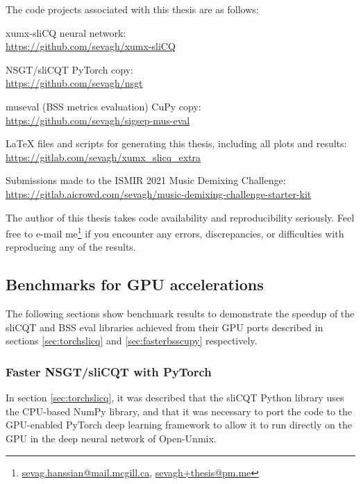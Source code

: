\documentclass[report.tex]{subfiles}
\begin{document}
The code projects associated with this thesis are as follows:
\begin{tight_enumerate}
	\item
		xumx-sliCQ neural network:\\
		\url{https://github.com/sevagh/xumx-sliCQ}
	\item
		NSGT/sliCQT PyTorch copy:\\
		\url{https://github.com/sevagh/nsgt}
	\item
		museval (BSS metrics evaluation) CuPy copy:\\
		\url{https://github.com/sevagh/sigsep-mus-eval}
	\item
		LaTeX files and scripts for generating this thesis, including all plots and results:\\
		\url{https://gitlab.com/sevagh/xumx_slicq_extra}
	\item
		Submissions made to the ISMIR 2021 Music Demixing Challenge:\\
		\url{https://gitlab.aicrowd.com/sevagh/music-demixing-challenge-starter-kit}
\end{tight_enumerate}

The author of this thesis takes code availability and reproducibility seriously. Feel free to e-mail me\footnote{\href{mailto:sevag.hanssian@mail.mcgill.ca}{sevag.hanssian@mail.mcgill.ca}, \href{mailto:sevagh+thesis@pm.me}{sevagh+thesis@pm.me}} if you encounter any errors, discrepancies, or difficulties with reproducing any of the results.

\subsection{Benchmarks for GPU accelerations}

The following sections show benchmark results to demonstrate the speedup of the sliCQT and BSS eval libraries achieved from their GPU ports described in sections \ref{sec:torchslicq} and \ref{sec:fasterbsscupy} respectively.

\subsubsection{Faster NSGT/sliCQT with PyTorch}

In section \ref{sec:torchslicq}, it was described that the sliCQT Python library uses the CPU-based NumPy library, and that it was necessary to port the code to the GPU-enabled PyTorch deep learning framework to allow it to run directly on the GPU in the deep neural network of Open-Unmix.
\end{document}
